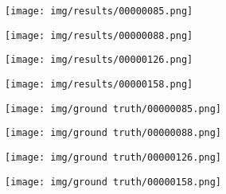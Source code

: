 \documentclass[conference]{IEEEtran}
\begin{document}
    \begin{figure*}[htbp]
        \centering

        \begin{subfigure}[b]{0.22\linewidth}
            \centering
            \texttt{[image: img/results/00000085.png]}
            \caption{}
            \label{res:1:85}
        \end{subfigure}
        \hfill
        \begin{subfigure}[b]{0.22\linewidth}
            \centering
            \texttt{[image: img/results/00000088.png]}
            \caption{}
            \label{res:1:88}
        \end{subfigure}
        \hfill
        \begin{subfigure}[b]{0.22\linewidth}
            \centering
            \texttt{[image: img/results/00000126.png]}
            \caption{}
            \label{res:1:126}
        \end{subfigure}
        \hfill
        \begin{subfigure}[b]{0.22\linewidth}
            \centering
            \texttt{[image: img/results/00000158.png]}
            \caption{}
            \label{res:1:158}
        \end{subfigure}

        \begin{subfigure}[b]{0.22\linewidth}
            \centering
            \texttt{[image: img/ground truth/00000085.png]}
            \caption{}
            \label{res:1:85:gt}
        \end{subfigure}
        \hfill
        \begin{subfigure}[b]{0.22\linewidth}
            \centering
            \texttt{[image: img/ground truth/00000088.png]}
            \caption{}
            \label{res:1:88:gt}
        \end{subfigure}
        \hfill
        \begin{subfigure}[b]{0.22\linewidth}
            \centering
            \texttt{[image: img/ground truth/00000126.png]}
            \caption{}
            \label{res:1:126:gt}
        \end{subfigure}
        \hfill
        \begin{subfigure}[b]{0.22\linewidth}
            \centering
            \texttt{[image: img/ground truth/00000158.png]}
            \caption{}
            \label{res:1:158:gt}
        \end{subfigure}


\end{figure*}
\end{document}
